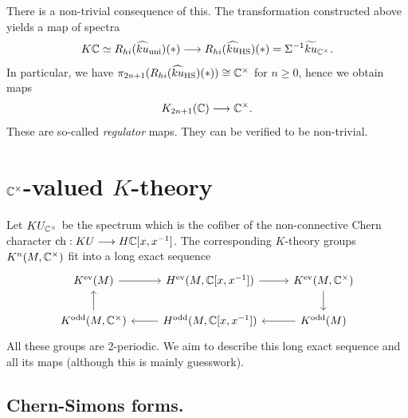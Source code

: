 \documentclass[10pt]{amsart}
\begin{document}
\begin{remark}
There is a non-trivial consequence of this. The transformation constructed above yields a map of spectra
\[
K\mathbb{C} \simeq R_{hi}(\widehat{ku}_{\mathrm{uni}})(*) \longrightarrow R_{hi}(\widehat{ku}_{\mathrm{HS}})(*) = \Sigma^{-1}\widetilde{ku}_{\mathbb{C}^\times}.
\]
In particular, we have $\pi_{2n+1}(R_{hi}(\widehat{ku}_{\mathrm{HS}})(*)) \cong \mathbb{C}^\times$ for $n \geq 0$, hence we obtain maps
\[
K_{2n+1}(\mathbb{C}) \longrightarrow \mathbb{C}^\times.
\]
These are so-called \emph{regulator} maps. They can be verified to be non-trivial.
\end{remark}

\appendix

\section{\texorpdfstring{$\mathbb{C}^\times$}{C}-valued \texorpdfstring{$K$}{K}-theory}
Let $KU_{\mathbb{C}^\times}$ be the spectrum which is the cofiber of the non-connective Chern character $\mathrm{ch} : KU \longrightarrow H\mathbb{C}[x, x^{-1}]$. The corresponding $K$-theory groups $K^n(M, \mathbb{C}^\times)$ fit into a long exact sequence
\[
\begin{tikzcd}
K^{\mathrm{ev}}(M) \ar[r]
& 
H^{\mathrm{ev}}(M, \bC[x, x^{-1}])
\ar[r]
&
K^{\mathrm{ev}}(M, \bC^\times)
\ar[d]
\\
K^{\mathrm{odd}}(M, \bC^\times) \ar[u] & H^{\mathrm{odd}}(M, \bC[x, x^{-1}]) \ar[l]& K^{\mathrm{odd}}(M) 
\ar[l]
\end{tikzcd}
\]
All these groups are 2-periodic. We aim to describe this long exact sequence and all its maps (although this is mainly guesswork).

\subsection{Chern-Simons forms.}
\end{document}
